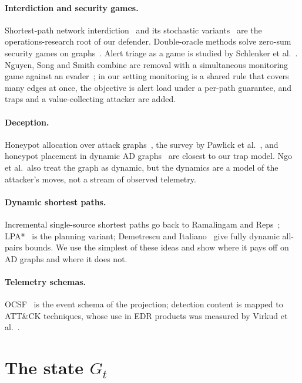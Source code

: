 \documentclass[10pt,twocolumn]{article}
\newcommand{\Gt}{G_t}
\begin{document}
\paragraph{Interdiction and security games.} Shortest-path network
interdiction~\cite{israeli2002interdiction} and its stochastic variants~\cite{morton2007models}
are the operations-research root of our defender. Double-oracle methods solve
zero-sum security games on graphs~\cite{jain2011double}. Alert triage as a game is
studied by Schlenker et al.~\cite{schlenker2017alerts}. Nguyen, Song and Smith combine arc
removal with a simultaneous monitoring game against an evader~\cite{nguyen2023nisg}; in our
setting monitoring is a shared rule that covers many edges at once, the objective is alert load
under a per-path guarantee, and traps and a value-collecting attacker are added.

\paragraph{Deception.} Honeypot allocation over attack graphs~\cite{anwar2020honeypot},
the survey by Pawlick et al.~\cite{pawlick2019taxonomy}, and honeypot placement in
dynamic AD graphs~\cite{ngo2024catch} are closest to our trap model. Ngo et al.\ also
treat the graph as dynamic, but the dynamics are a model of the attacker's moves, not a
stream of observed telemetry.

\paragraph{Dynamic shortest paths.} Incremental single-source shortest paths go back
to Ramalingam and Reps~\cite{ramalingam1996incremental}; LPA*~\cite{koenig2004lpa} is the
planning variant; Demetrescu and Italiano~\cite{demetrescu2004apsp} give fully dynamic
all-pairs bounds. We use the simplest of these ideas and show where it pays off on AD
graphs and where it does not.

\paragraph{Telemetry schemas.} OCSF~\cite{ocsf} is the event schema of the projection;
detection content is mapped to ATT\&CK techniques, whose use in EDR products was
measured by Virkud et al.~\cite{virkud2024edr}.

\section{The state $\Gt$}\label{sec:model}
\end{document}
